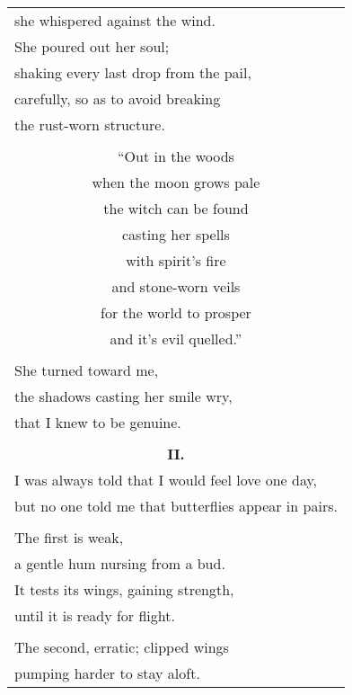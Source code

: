 \documentclass{article}
\begin{document}
\begin{center}
\begin{longtable}{l}
she whispered against the wind. \\
She poured out her soul; \\
shaking every last drop from the pail, \\
carefully, so as to avoid breaking \\
the rust-worn structure. \\
\\
\multicolumn{1}{c}{``Out in the woods} \\
\multicolumn{1}{c}{when the moon grows pale} \\
\multicolumn{1}{c}{the witch can be found} \\
\multicolumn{1}{c}{casting her spells} \\
\multicolumn{1}{c}{with spirit's fire} \\
\multicolumn{1}{c}{and stone-worn veils} \\
\multicolumn{1}{c}{for the world to prosper} \\
\multicolumn{1}{c}{and it's evil quelled.''} \\
\\
She turned toward me, \\
the shadows casting her smile wry, \\
that I knew to be genuine. \\
\\
\multicolumn{1}{c}{\textbf{II.}} \\ %
I was always told that I would feel love one day, \\
but no one told me that butterflies appear in pairs. \\
\\
The first is weak, \\
a gentle hum nursing from a bud. \\
It tests its wings, gaining strength, \\
until it is ready for flight. \\
\\
The second, erratic; clipped wings \\
pumping harder to stay aloft. \\

\end{longtable}
\end{center}
\end{document}
